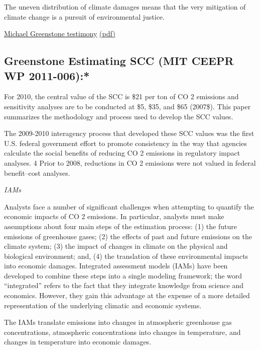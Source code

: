 \documentclass[
]{book}
\begin{document}
The uneven distribution of climate damages means that the very mitigation of climate change is a
pursuit of environmental justice.

\href{http://www.impactlab.org/news-insights/michael-greenstone-testifies-on-the-economic-effects-of-climate-change/}{Michael Greenstone testimony}
\href{pdf/Greenstone_2019_Testimony.pdf}{(pdf)}

\hypertarget{greenstone-estimating-scc-mit-ceepr-wp-2011-006}{%
\subsection{Greenstone Estimating SCC (MIT CEEPR WP 2011-006):*}\label{greenstone-estimating-scc-mit-ceepr-wp-2011-006}}

For 2010, the central value of the
SCC is \$21 per ton of CO 2 emissions and sensitivity analyses are to be conducted
at \$5, \$35, and \$65 (2007\$). This paper summarizes the methodology and
process used to develop the SCC values.

The 2009-2010 interagency process that developed these SCC values was the first U.S. federal
government effort to promote consistency in the way that agencies calculate the social benefits of
reducing CO 2 emissions in regulatory impact analyses. 4 Prior to 2008, reductions in CO 2
emissions were not valued in federal benefit--cost analyses.

\emph{IAMs}

Analysts face a number of significant challenges when attempting to quantify the economic
impacts of CO 2 emissions. In particular, analysts must make assumptions about four main steps
of the estimation process: (1) the future emissions of greenhouse gases; (2) the effects of past and
future emissions on the climate system; (3) the impact of changes in climate on the physical and
biological environment; and, (4) the translation of these environmental impacts into economic
damages. Integrated assessment models (IAMs) have been developed to combine these steps
into a single modeling framework; the word ``integrated'' refers to the fact that they integrate
knowledge from science and economics. However, they gain this advantage at the expense of a
more detailed representation of the underlying climatic and economic systems.

The IAMs translate emissions into changes in atmospheric greenhouse gas concentrations,
atmospheric concentrations into changes in temperature, and changes in temperature into
economic damages.
\end{document}
